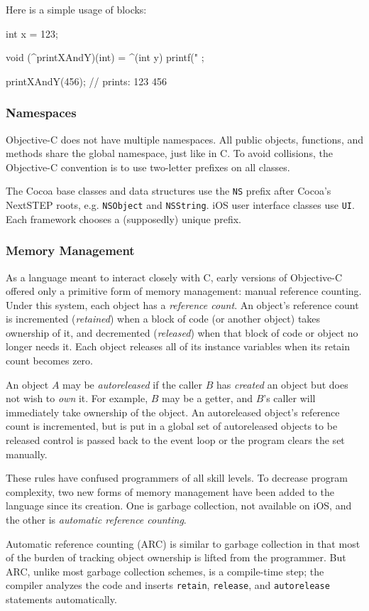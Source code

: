 Here is a simple usage of blocks:

\begin{objc}
int x = 123;
 
void (^printXAndY)(int) = ^(int y) {
    printf("%
};

printXAndY(456); // prints: 123 456
\end{objc}

\subsubsection{Namespaces}
\label{sect:objc_namespaces}

Objective-C does not have multiple namespaces. All public objects, functions,
and methods share the global namespace, just like in C. To avoid collisions, the
Objective-C convention is to use two-letter prefixes on all classes.

The Cocoa base classes and data structures use the \texttt{NS} prefix after
Cocoa's NextSTEP roots, e.g. \texttt{NSObject} and \texttt{NSString}. iOS user
interface classes use \texttt{UI}. Each framework chooses a (supposedly) unique
prefix.

\subsubsection{Memory Management}
\label{sect:objc_memory}

As a language meant to interact closely with C, early versions of Objective-C
offered only a primitive form of memory management: manual reference counting.
Under this system, each object has a \emph{reference count}. An object's
reference count is incremented (\emph{retained}) when a block of code (or
another object) takes ownership of it, and decremented (\emph{released}) when
that block of code or object no longer needs it. Each object releases all of its
instance variables when its retain count becomes zero.

An object $A$ may be \emph{autoreleased} if the caller $B$ has \emph{created} an
object but does not wish to \emph{own} it. For example, $B$ may be a getter, and
$B$'s caller will immediately take ownership of the object. An autoreleased
object's reference count is incremented, but is put in a global set of
autoreleased objects to be released control is passed back to the event loop or
the program clears the set manually.

These rules have confused programmers of all skill levels. To decrease program
complexity, two new forms of memory management have been added to the language
since its creation. One is garbage collection, not available on iOS, and the
other is \emph{automatic reference counting}.

Automatic reference counting (ARC) is similar to garbage collection in that most
of the burden of tracking object ownership is lifted from the programmer. But
ARC, unlike most garbage collection schemes, is a compile-time step; the
compiler analyzes the code and inserts \texttt{retain}, \texttt{release}, and
\texttt{autorelease} statements automatically.
